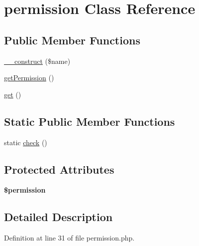 \hypertarget{classcommon_1_1user_1_1legacy_1_1permission}{\section{permission \-Class \-Reference}
\label{classcommon_1_1user_1_1legacy_1_1permission}
}
\subsection*{\-Public \-Member \-Functions}
\begin{DoxyCompactItemize}
\item 
\hyperlink{classcommon_1_1user_1_1legacy_1_1permission_a4717bbfc70a40a57ee741ed70766c309}{\-\_\-\-\_\-construct} (\$name)
\item 
\hyperlink{classcommon_1_1user_1_1legacy_1_1permission_a478067ecf173884c2ee3e5b94e746200}{get\-Permission} ()
\item 
\hyperlink{classcommon_1_1user_1_1legacy_1_1permission_ac33ee765f5ad9f134540bac393721cfe}{get} ()
\end{DoxyCompactItemize}
\subsection*{\-Static \-Public \-Member \-Functions}
\begin{DoxyCompactItemize}
\item 
static \hyperlink{classcommon_1_1user_1_1legacy_1_1permission_a3a934bd1e982502106ee5dfac2e4e2ed}{check} ()
\end{DoxyCompactItemize}
\subsection*{\-Protected \-Attributes}
\begin{DoxyCompactItemize}
\item 
\hypertarget{classcommon_1_1user_1_1legacy_1_1permission_aad04b6f3304fe6a13d5be37f7cd28938}{{\bfseries \$permission}}\label{classcommon_1_1user_1_1legacy_1_1permission_aad04b6f3304fe6a13d5be37f7cd28938}

\end{DoxyCompactItemize}


\subsection{\-Detailed \-Description}


\-Definition at line 31 of file permission.\-php.



